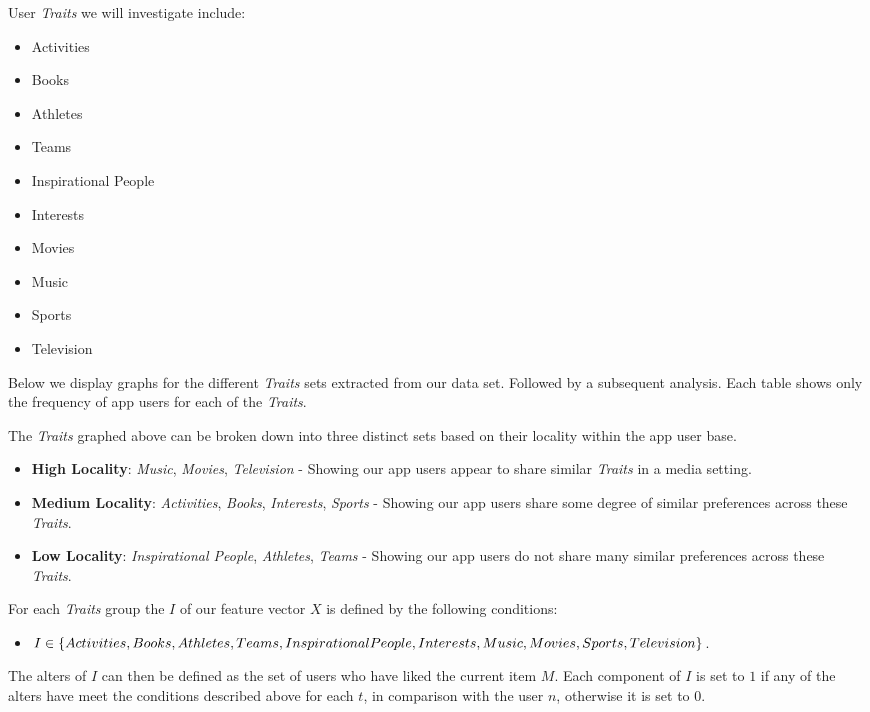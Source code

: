 User \emph{Traits} we will investigate include:
\begin{itemize}
\item Activities
\item Books
\item Athletes
\item Teams
\item Inspirational People
\item Interests
\item Movies
\item Music
\item Sports
\item Television
\end{itemize}

Below we display graphs for the different \emph{Traits} sets extracted from our data set. Followed by a subsequent analysis.
Each table shows only the frequency of app users for each of the \emph{Traits}.


The \emph{Traits} graphed above can be broken down into three distinct sets based on their locality within the app user base.

\begin{itemize}
\item \textbf{High Locality}: \emph{Music}, \emph{Movies}, \emph{Television} - Showing our app users appear to share similar \emph{Traits} in a media 
setting.
\item \textbf{Medium Locality}: \emph{Activities}, \emph{Books}, \emph{Interests}, \emph{Sports} - Showing our app users share some degree of similar preferences 
across these \emph{Traits}.
\item \textbf{Low Locality}: \emph{Inspirational People}, \emph{Athletes}, \emph{Teams} - Showing our app users do not share many similar preferences  
across these \emph{Traits}.
\end{itemize}

For each \emph{Traits} group the $I$ of our feature vector $X$ is defined by the following conditions:
\begin{itemize}
\item $I \in \{Activities, Books, Athletes, Teams, Inspirational People, Interests, Music, 
\\ Movies, Sports, Television\}$.
\end{itemize}

The alters of $I$ can then be defined as the set of users who have liked the current item $M$.
Each component of $I$ is set to $1$ if any of the alters have meet the conditions described above for each $t$, in comparison 
with the user $n$, otherwise it is set to $0$.

